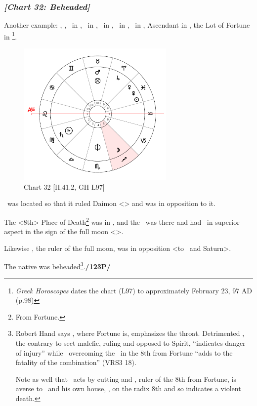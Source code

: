 \subsubsection{\textit{[Chart 32: Beheaded]}}
Another example: \Sun, \Mercury, \Venus\, in \Pisces, \Saturn\, in \Virgo, \Jupiter\, in \Aries, \Mars\, in \Taurus, \Moon\, in \Sagittarius, Ascendant in \Leo, the Lot of Fortune in \Taurus
\footnote{\textit{Greek Horoscopes} dates the chart (L97) to approximately February 23, 97 AD (p.98)}.  

\clearpage
\begin{figure}
\centering
\includegraphics[width=0.68\textwidth]{charts/2_41_2}
\caption{Chart 32 [II.41.2, GH L97]}
\label{fig:chart32}
\end{figure} 

\noindent \Mars\, was located so that it ruled Daimon <\Scorpio> and was in opposition to it. 

The <8th> Place of Death\footnote{From Fortune.} was in \Sagittarius, and the \Moon\, was there and had \Saturn\, in superior aspect in the sign of the full moon <\Virgo>. 

Likewise \Mercury, the ruler of the full moon, was in opposition <to \Virgo\, and Saturn>. 

The native was beheaded\footnote{Robert Hand says \Taurus, where Fortune is, emphasizes the throat. Detrimented \Mars, the contrary to sect malefic, ruling and opposed to Spirit, ``indicates danger of injury'' while \Saturn\, overcoming the \Moon\, in the 8th from Fortune ``adds to the fatality of the combination'' (VRS3 18).

Note as well that \Mars\, acts by cutting and \Jupiter, ruler of the 8th from Fortune, is averse to \Mars\, and his own house, \Pisces, on the radix 8th and so indicates a violent death.}.\textbf{/123P/} 
\newpage
